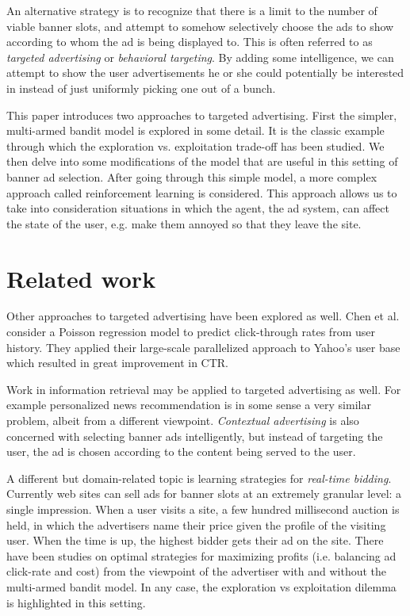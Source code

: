 \documentclass{article} %
\begin{document}
An alternative strategy is to recognize that there is a limit to the number of
viable banner slots, and attempt to somehow selectively choose the ads to show
according to whom the ad is being displayed to. This is often referred to as
\emph{targeted advertising} or \emph{behavioral targeting}. By adding some
intelligence, we can attempt to show the user advertisements he or she could
potentially be interested in instead of just uniformly picking one out of a
bunch.

This paper introduces two approaches to targeted advertising. First the
simpler, multi-armed bandit model is explored in some detail. It is the classic
example through which the exploration vs.  exploitation trade-off has been
studied. We then delve into some modifications of the model that are useful in
this setting of banner ad selection. After going through this simple model, a
more complex approach called reinforcement learning is considered. This
approach allows us to take into consideration situations in which the agent,
the ad system, can affect the state of the user, e.g. make them annoyed so that
they leave the site.

\section{Related work}

Other approaches to targeted advertising have been explored as well. Chen et
al. \cite{chen2009large} consider a Poisson regression model to predict
click-through rates from user history.  They applied their large-scale
parallelized approach to Yahoo's user base which resulted in great improvement
in CTR.

Work in information retrieval may be applied to targeted advertising as well.
For example personalized news recommendation is in some sense a very similar
problem, albeit from a different viewpoint. \emph{Contextual advertising} is
also concerned with selecting banner ads intelligently, but instead of
targeting the user, the ad is chosen according to the content being served to
the user.

A different but domain-related topic is learning strategies for
\emph{real-time bidding}. Currently web sites can sell ads for banner slots at
an extremely granular level: a single impression. When a user visits a site, a
few hundred millisecond auction is held, in which the advertisers name their
price given the profile of the visiting user. When the time is up, the highest
bidder gets their ad on the site. There have been studies on optimal strategies
for maximizing profits (i.e. balancing ad click-rate and cost) from the
viewpoint of the advertiser with \cite{ding2013multi} and without
\cite{chakraborty2010selective} the multi-armed bandit model. In any case, the
exploration vs exploitation dilemma is highlighted in this setting.
\end{document}
